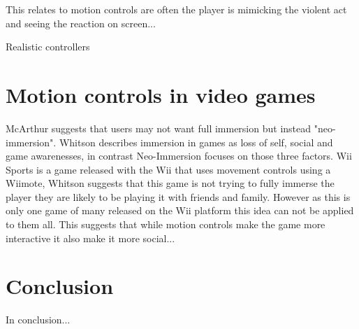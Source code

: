 \documentclass{scrartcl}
\begin{document}
This relates to motion controls are often the player is mimicking the violent act and seeing the reaction on screen...


Realistic controllers \cite{McGloin}

\section{Motion controls in video games}
McArthur suggests that users may not want full immersion but instead "neo-immersion". \cite{McArthur} Whitson describes immersion in games as loss of  self, social and game awarenesses, in contrast Neo-Immersion focuses on those three factors. \cite{Whitson} Wii Sports is a game released with the Wii that uses movement controls using a Wiimote, Whitson suggests that this game is not trying to fully immerse the player they are likely to be playing it with friends and family. However as this is only one game of many released on the Wii platform this idea can not be applied to them all. 
This suggests that while motion controls make the game more interactive it also make it more social...




\section{Conclusion}
In conclusion...

	


	
\end{document}
